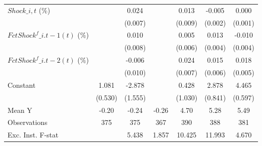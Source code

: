 {\begin{tabular}{l*{6}{c}}
\addlinespace
$ Shock\_{i,t}$ (\%) &                     &       0.024\sym{***}&                     &       0.013         &      -0.005\sym{**} &       0.000         \\
                    &                     &     (0.007)         &                     &     (0.009)         &     (0.002)         &     (0.001)         \\
\addlinespace
$ FctShock^f\_{i.t-1}(t)$ (\%)&                     &       0.010         &                     &       0.005         &       0.013\sym{***}&      -0.010\sym{**} \\
                    &                     &     (0.008)         &                     &     (0.006)         &     (0.004)         &     (0.004)         \\
\addlinespace
$ FctShock^f\_{i.t-2}(t)$ (\%)&                     &      -0.006         &                     &       0.024\sym{***}&       0.015\sym{**} &       0.018\sym{***}\\
                    &                     &     (0.010)         &                     &     (0.007)         &     (0.006)         &     (0.005)         \\
\addlinespace
Constant            &       1.081\sym{*}  &      -2.878\sym{*}  &                     &       0.428         &       2.878\sym{***}&       4.465\sym{***}\\
                    &     (0.530)         &     (1.555)         &                     &     (1.030)         &     (0.841)         &     (0.597)         \\
\midrule
Mean Y              &       -0.20         &       -0.24         &       -0.26         &        4.70         &        5.28         &        5.49         \\
Observations        &         375         &         375         &         367         &         390         &         388         &         381         \\
Exc. Inst. F-stat   &                     &       5.438         &       1.857         &      10.425         &      11.993         &       4.670         \\
\bottomrule
\end{tabular}
}
